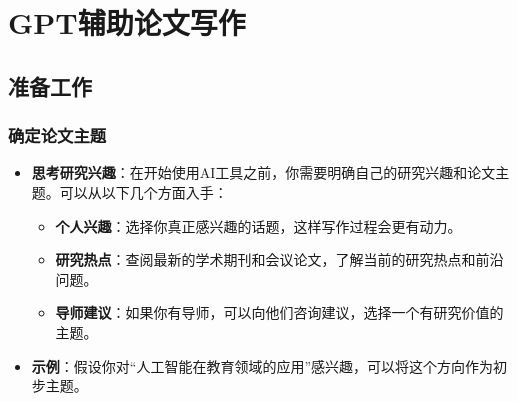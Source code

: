 \section{GPT辅助论文写作}
\subsection{准备工作}
\subsubsection{确定论文主题}
\begin{itemize}
    \item \textbf{思考研究兴趣}：在开始使用AI工具之前，你需要明确自己的研究兴趣和论文主题。可以从以下几个方面入手：
    \begin{itemize}
        \item \textbf{个人兴趣}：选择你真正感兴趣的话题，这样写作过程会更有动力。
        \item \textbf{研究热点}：查阅最新的学术期刊和会议论文，了解当前的研究热点和前沿问题。
        \item \textbf{导师建议}：如果你有导师，可以向他们咨询建议，选择一个有研究价值的主题。
    \end{itemize}
    \item \textbf{示例}：假设你对“人工智能在教育领域的应用”感兴趣，可以将这个方向作为初步主题。
\end{itemize}


